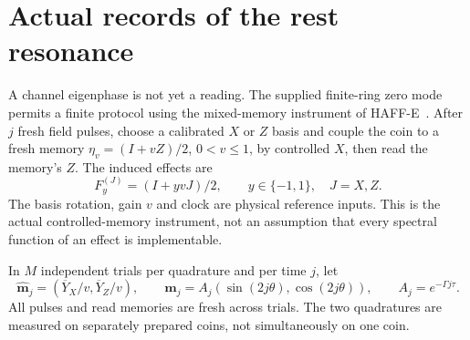 \documentclass[12pt,a4paper]{article}
\theoremstyle{definition}
\theoremstyle{remark}
\begin{document}
\section{Actual records of the rest resonance}
\label{sec:finite-read}

A channel eigenphase is not yet a reading. The supplied finite-ring zero mode permits a finite protocol using the mixed-memory instrument of HAFF-E~\cite{PaperE}. After $j$ fresh field pulses, choose a calibrated $X$ or $Z$ basis and couple the coin to a fresh memory
$\eta_v=(I+vZ)/2$, $0<v\le1$, by controlled $X$, then read the memory's $Z$. The induced effects are
\[
 F_y^{(J)}=(I+yvJ)/2,\qquad y\in\{-1,1\},\quad J=X,Z .
\]
The basis rotation, gain $v$ and clock are physical reference inputs. This is the actual controlled-memory instrument, not an assumption that every spectral function of an effect is implementable.

In $M$ independent trials per quadrature and per time $j$, let
\[
 \widehat{\mathbf m}_j=(\overline Y_X/v,\overline Y_Z/v),\qquad
 \mathbf m_j=A_j(\sin(2j\theta),\cos(2j\theta)),\qquad
 A_j=e^{-\Gamma j\tau}.
\]
All pulses and read memories are fresh across trials. The two quadratures are measured on separately prepared coins, not simultaneously on one coin.
\end{document}
